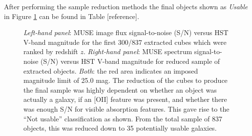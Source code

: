 \documentclass[12pt, twocolumn]{revtex4-1}    %
\begin{document}

After performing the sample reduction methods the final objects shown as \textit{Usable} in Figure \ref{fig:sn_vband} can be found in Table [reference].

\begin{figure}
  \captionsetup{justification=raggedright}
  \caption[HUDF Objects]{\textit{Left-hand panel}: MUSE image flux signal-to-noise (S/N) versus HST V-band magnitude for the first 300/837 extracted cubes which were ranked by redshift $z$. \textit{Right-hand panel}: MUSE spectrum signal-to-noise (S/N) versus HST V-band magnitude for reduced sample of extracted objects. \textit{Both}: the red area indicates an imposed magnitude limit of 25.0 mag. The reduction of the cubes to produce the final sample was highly dependent on whether an object was actually a galaxy, if an [OII] feature was present, and whether there was enough S/N for visible absorption features. This gave rise to the ``Not usable'' classification as shown. From the total sample of 837 objects, this was reduced down to 35 potentially usable galaxies.}
\label{fig:sn_vband}
\end{figure}

\end{document}

